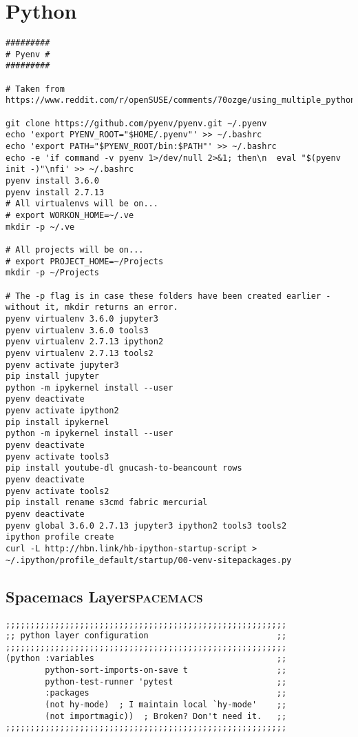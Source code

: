 \documentclass[11pt]{article}
\begin{document}
\section{Python}
\label{sec:org759573a}
\begin{verbatim}
#########
# Pyenv #
#########

# Taken from https://www.reddit.com/r/openSUSE/comments/70ozge/using_multiple_python_versions_on_leap/dos6798

git clone https://github.com/pyenv/pyenv.git ~/.pyenv
echo 'export PYENV_ROOT="$HOME/.pyenv"' >> ~/.bashrc
echo 'export PATH="$PYENV_ROOT/bin:$PATH"' >> ~/.bashrc
echo -e 'if command -v pyenv 1>/dev/null 2>&1; then\n  eval "$(pyenv init -)"\nfi' >> ~/.bashrc
pyenv install 3.6.0
pyenv install 2.7.13
# All virtualenvs will be on...
# export WORKON_HOME=~/.ve
mkdir -p ~/.ve 

# All projects will be on...
# export PROJECT_HOME=~/Projects
mkdir -p ~/Projects 

# The -p flag is in case these folders have been created earlier - without it, mkdir returns an error.
pyenv virtualenv 3.6.0 jupyter3
pyenv virtualenv 3.6.0 tools3
pyenv virtualenv 2.7.13 ipython2
pyenv virtualenv 2.7.13 tools2
pyenv activate jupyter3
pip install jupyter
python -m ipykernel install --user
pyenv deactivate
pyenv activate ipython2
pip install ipykernel
python -m ipykernel install --user
pyenv deactivate
pyenv activate tools3
pip install youtube-dl gnucash-to-beancount rows 
pyenv deactivate
pyenv activate tools2
pip install rename s3cmd fabric mercurial
pyenv deactivate
pyenv global 3.6.0 2.7.13 jupyter3 ipython2 tools3 tools2
ipython profile create
curl -L http://hbn.link/hb-ipython-startup-script > ~/.ipython/profile_default/startup/00-venv-sitepackages.py

\end{verbatim}

\subsection{Spacemacs Layer\hfill{}\textsc{spacemacs}}
\label{sec:org5dc0da4}
\begin{verbatim}
;;;;;;;;;;;;;;;;;;;;;;;;;;;;;;;;;;;;;;;;;;;;;;;;;;;;;;;;;
;; python layer configuration                          ;;
;;;;;;;;;;;;;;;;;;;;;;;;;;;;;;;;;;;;;;;;;;;;;;;;;;;;;;;;;
(python :variables                                     ;;
        python-sort-imports-on-save t                  ;;
        python-test-runner 'pytest                     ;;
        :packages                                      ;;
        (not hy-mode)  ; I maintain local `hy-mode'    ;;
        (not importmagic))  ; Broken? Don't need it.   ;;
;;;;;;;;;;;;;;;;;;;;;;;;;;;;;;;;;;;;;;;;;;;;;;;;;;;;;;;;;
\end{verbatim}
\end{document}
